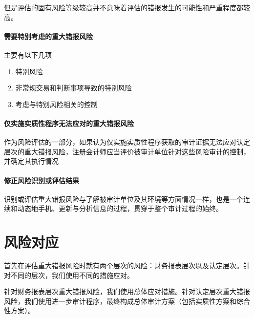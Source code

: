 \documentclass[UTF8,12pt]{ctexart}
\numberwithin{equation}{section} %
\numberwithin{figure}{section}
\numberwithin{table}{section}
\begin{document}
	但是评估的固有风险等级较高并不意味着评估的错报发生的可能性和严重程度都较高。
	
	\paragraph{需要特别考虑的重大错报风险}
	主要有以下几项
	\begin{enumerate}
		\item 特别风险
		
		\item 非常规交易和判断事项导致的特别风险
		
		\item 考虑与特别风险相关的控制
	\end{enumerate}
	
	
	
	\paragraph{仅实施实质性程序无法应对的重大错报风险}
	作为风险评估的一部分，如果认为仅实施实质性程序获取的审计证据无法应对认定层次的重大错报风险，注册会计师应当评价被审计单位针对这些风险审计的控制，并确定其执行情况
	
	\paragraph{修正风险识别或评估结果}
	识别或评估重大错报风险与了解被审计单位及其环境等方面情况一样，也是一个连续和动态地手机、更新与分析信息的过程，贯穿于整个审计过程的始终。
	
	\newpage
	\section{风险对应}
	首先在评估重大错报风险时就有两个层次的风险：财务报表层次以及认定层次。针对不同的层次，我们使用不同的措施应对。
	
	针对财务报表层次重大错报风险，我们使用总体应对措施。针对认定层次重大错报风险，我们使用进一步审计程序，最终构成总体审计方案（包括实质性方案和综合性方案）。
	
\end{document}
